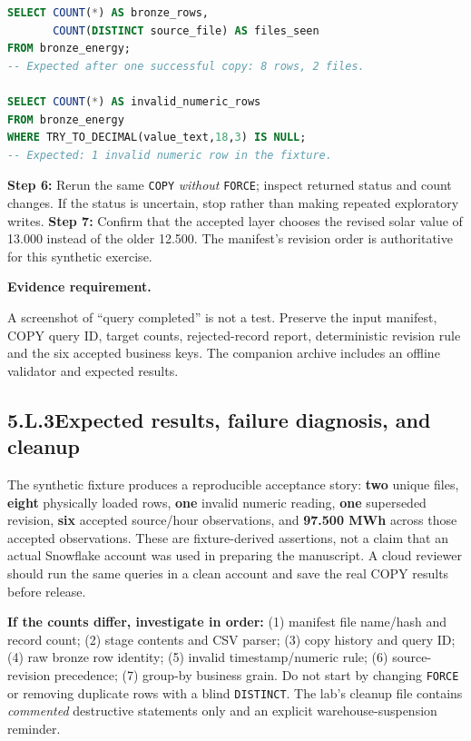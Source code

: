 \documentclass[11pt,twoside]{article}
\newcommand{\topic}[2]{\subsection*{#1\quad #2}}
\begin{document}
\begin{lstlisting}[language=SQL,caption={The essential reconciliation: physical vs accepted rows.}]
SELECT COUNT(*) AS bronze_rows,
       COUNT(DISTINCT source_file) AS files_seen
FROM bronze_energy;
-- Expected after one successful copy: 8 rows, 2 files.

SELECT COUNT(*) AS invalid_numeric_rows
FROM bronze_energy
WHERE TRY_TO_DECIMAL(value_text,18,3) IS NULL;
-- Expected: 1 invalid numeric row in the fixture.
\end{lstlisting}
\textbf{Step 6:} Rerun the same \texttt{COPY} \emph{without} \texttt{FORCE}; inspect returned status and count changes. If the status is uncertain, stop rather than making repeated exploratory writes. \textbf{Step 7:} Confirm that the accepted layer chooses the revised solar value of 13.000 instead of the older 12.500. The manifest's revision order is authoritative for this synthetic exercise.

\begin{insight}\textbf{Evidence requirement.}\par
A screenshot of ``query completed'' is not a test. Preserve the input manifest, COPY query ID, target counts, rejected-record report, deterministic revision rule and the six accepted business keys. The companion archive includes an offline validator and expected results.\end{insight}
\newpage
\topic{5.L.3}{Expected results, failure diagnosis, and cleanup}
The synthetic fixture produces a reproducible acceptance story: \textbf{two} unique files, \textbf{eight} physically loaded rows, \textbf{one} invalid numeric reading, \textbf{one} superseded revision, \textbf{six} accepted source/hour observations, and \textbf{97.500 MWh} across those accepted observations. These are fixture-derived assertions, not a claim that an actual Snowflake account was used in preparing the manuscript. A cloud reviewer should run the same queries in a clean account and save the real COPY results before release.

\textbf{If the counts differ, investigate in order:} (1) manifest file name/hash and record count; (2) stage contents and CSV parser; (3) copy history and query ID; (4) raw bronze row identity; (5) invalid timestamp/numeric rule; (6) source-revision precedence; (7) group-by business grain. Do not start by changing \texttt{FORCE} or removing duplicate rows with a blind \texttt{DISTINCT}. The lab's cleanup file contains \emph{commented} destructive statements only and an explicit warehouse-suspension reminder.
\end{document}
